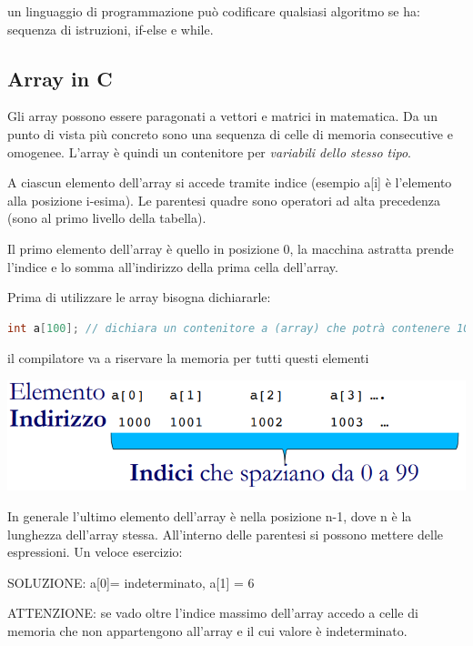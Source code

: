 \documentclass[
  paper=a4,
  oneside  ,captions=tableheading
]{scrbook}
\begin{document}
un linguaggio di programmazione può codificare qualsiasi algoritmo se
ha: sequenza di istruzioni, if-else e while.

\hypertarget{array-in-c}{%
\subsection{Array in C}\label{array-in-c}}

Gli array possono essere paragonati a vettori e matrici in matematica.
Da un punto di vista più concreto sono una sequenza di celle di memoria
consecutive e omogenee. L'array è quindi un contenitore per
\emph{variabili dello stesso tipo}.

A ciascun elemento dell'array si accede tramite indice (esempio a{[}i{]}
è l'elemento alla posizione i-esima). Le parentesi quadre sono operatori
ad alta precedenza (sono al primo livello della tabella).

Il primo elemento dell'array è quello in posizione 0, la macchina
astratta prende l'indice e lo somma all'indirizzo della prima cella
dell'array.

Prima di utilizzare le array bisogna dichiararle:

\begin{lstlisting}[language={C++}]
int a[100]; // dichiara un contenitore a (array) che potrà contenere 100 elementi di tipo int, il primo elemento lo si trova in a[0], l'ultimo in a[99]
\end{lstlisting}

il compilatore va a riservare la memoria per tutti questi elementi

\includegraphics{./image/image-20201208144533768-1607774562526.png}

In generale l'ultimo elemento dell'array è nella posizione n-1, dove n è
la lunghezza dell'array stessa. All'interno delle parentesi si possono
mettere delle espressioni. Un veloce esercizio:

SOLUZIONE: a{[}0{]}= indeterminato, a{[}1{]} = 6

ATTENZIONE: se vado oltre l'indice massimo dell'array accedo a celle di
memoria che non appartengono all'array e il cui valore è indeterminato.
\end{document}

